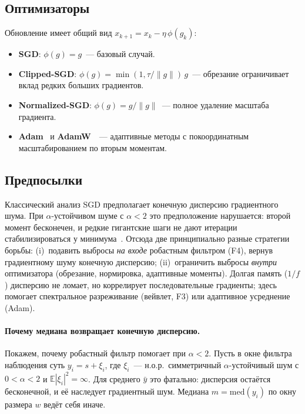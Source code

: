 \documentclass[conference]{IEEEtran}
\begin{document}
\subsection{Оптимизаторы}
\label{sec:opt}

Обновление имеет общий вид $x_{k+1}=x_k-\eta\,\phi(g_k)$:
\begin{itemize}
  \item \textbf{SGD}: $\phi(g)=g$~--- базовый случай.
  \item \textbf{Clipped-SGD}: $\phi(g)=\min(1,\tau/\|g\|)\,g$~---
        обрезание ограничивает вклад редких больших градиентов.
  \item \textbf{Normalized-SGD}: $\phi(g)=g/\|g\|$~--- полное удаление
        масштаба градиента.
  \item \textbf{Adam}~\cite{kingma2015adam} и
        \textbf{AdamW}~\cite{loshchilov2019adamw}~--- адаптивные методы с
        покоординатным масштабированием по вторым моментам.
\end{itemize}

\subsection{Предпосылки}
\label{sec:premises}

Классический анализ SGD предполагает конечную дисперсию градиентного
шума. При $\alpha$-устойчивом шуме с $\alpha<2$ это предположение
нарушается: второй момент бесконечен, и редкие гигантские шаги не дают
итерации стабилизироваться у минимума~\cite{simsekli2019tailindex,
gorbunov2020clipping}. Отсюда две принципиально разные стратегии борьбы:
(i)~подавить выбросы \emph{на входе} робастным фильтром (F4), вернув
градиентному шуму конечную дисперсию; (ii)~ограничить выбросы \emph{внутри}
оптимизатора (обрезание, нормировка, адаптивные моменты). Долгая память
($1/f$) дисперсию не ломает, но коррелирует последовательные градиенты;
здесь помогает спектральное разреживание (вейвлет, F3) или адаптивное
усреднение (Adam).

\paragraph{Почему медиана возвращает конечную дисперсию.}
Покажем, почему робастный фильтр помогает при $\alpha<2$. Пусть в окне
фильтра наблюдения суть $y_i=s+\xi_i$, где $\xi_i$~--- н.о.р.\ симметричный
$\alpha$-устойчивый шум с $0<\alpha<2$ и $\mathbb{E}|\xi_i|^2=\infty$. Для
среднего $\bar y$ это фатально: дисперсия остаётся бесконечной, и её
наследует градиентный шум. Медиана $m=\mathrm{med}(y_i)$ по окну размера
$w$ ведёт себя иначе.
\end{document}

